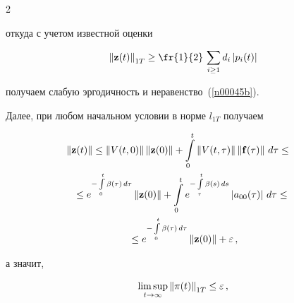 \begin{multicols}{2}
\begin{equation*}
\end{equation*}


\pagebreak





\noindent


откуда с учетом известной оценки~\cite{z06}


\begin{equation}


\left\|{\bf z}(t)\right\|_{1T} \ge \fr{1}{2}\,\sum_{i \ge 1}


d_i\left|p_i(t)\right| 


\label{212}


\end{equation}


получаем слабую эргодичность и неравенство~(\ref{n00045b}).





Далее, при любом начальном условии в норме  $l_{1T}$ получаем


\begin{multline*}


\!\!\!\!\!\left\|{\bf z}(t)\right\| \le \left\|V(t,0)\right\| \left\|{\bf


z}(0)\right\| + \int\limits_0^t


\left\|V(t,\tau)\right\| \left\|{\bf f}(\tau)\right\|\, d\tau \le {} \\


\le  e^{-\int\limits_0^t  \beta (\tau)\, d\tau}\left\|{\bf z}(0)\right\| +


\int\limits_0^t e^{-\int\limits_\tau^t \beta (s)\, d s}  \left|a_{00}(\tau)\right| \, d\tau  \le{} \\


{}\le


 e^{-\int\limits_0^t   \beta (\tau)\, d\tau}\left\|{\bf z}(0)\right\| +


\varepsilon\,,




\end{multline*}


а значит,


\begin{eqnarray*}


\limsup_{t \to \infty} \left\|{\bf \pi}(t)\right\|_{1T} \le


 \varepsilon\,,


\label{212002}


\end{eqnarray*}



\end{multicols}
